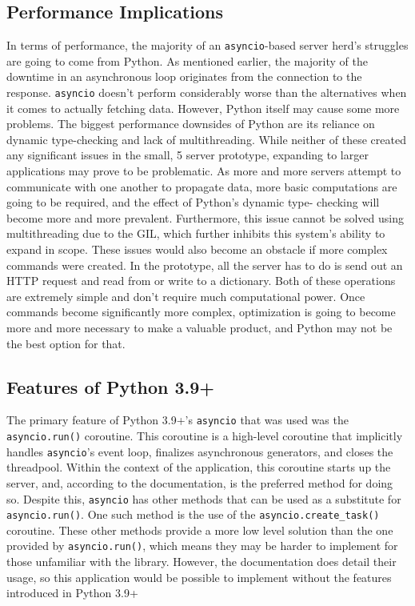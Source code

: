 \subsection{Performance Implications}
In terms of performance, the majority of an \texttt{asyncio}-based server herd's
struggles are going to come from Python. As mentioned earlier, the majority of
the downtime in an asynchronous loop originates from the connection to the
response. \texttt{asyncio} doesn't perform considerably worse than the
alternatives when it comes to actually fetching data. However, Python itself
may cause some more problems. The biggest performance downsides of Python are
its reliance on dynamic type-checking and lack of multithreading. While neither
of these created any significant issues in the small, 5 server prototype,
expanding to larger applications may prove to be problematic. As more and more
servers attempt to communicate with one another to propagate data, more basic
computations are going to be required, and the effect of Python's dynamic type-
checking will become more and more prevalent. Furthermore, this issue cannot be
solved using multithreading due to the GIL, which further inhibits this system's
ability to expand in scope. These issues would also become an obstacle if more
complex commands were created. In the prototype, all the server has to do is
send out an HTTP request and read from or write to a dictionary. Both of these
operations are extremely simple and don't require much computational power.
Once commands become significantly more complex, optimization is going to
become more and more necessary to make a valuable product, and Python may not be
the best option for that.

\subsection{Features of Python 3.9+}
The primary feature of Python 3.9+'s \texttt{asyncio} that was used was the
\texttt{asyncio.run()} coroutine. This coroutine is a high-level coroutine
that implicitly handles \texttt{asyncio}'s event loop, finalizes asynchronous
generators, and closes the threadpool. Within the context of the application,
this coroutine starts up the server, and, according to the documentation, is the
preferred method for doing so. Despite this, \texttt{asyncio} has other methods
that can be used as a substitute for \texttt{asyncio.run()}. One such method is
the use of the \texttt{asyncio.create\_task()} coroutine. These other methods
provide a more low level solution than the one provided by
\texttt{asyncio.run()}, which means they may be harder to implement for those
unfamiliar with the library. However, the documentation does detail their usage,
so this application would be possible to implement without the features
introduced in Python 3.9+

